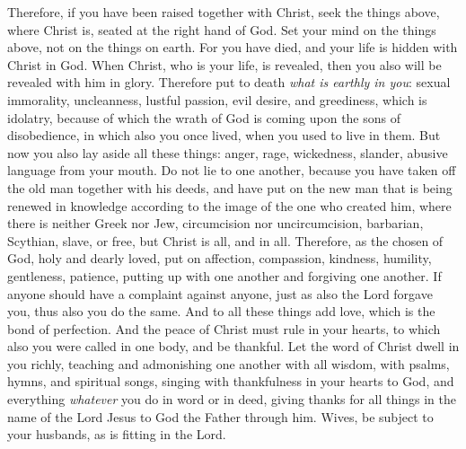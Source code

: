 \begin{biblechapter} %
 Therefore, if you have been raised together with Christ, seek the things above, where Christ is, seated at the right hand of God.
\verse Set your mind on the things above, not on the things on earth.
\verse For you have died, and your life is hidden with Christ in God.
\verse When Christ, who is your life, is revealed, then you also will be revealed with him in glory.
 Therefore put to death \textit{what is earthly in you}: sexual immorality, uncleanness, lustful passion, evil desire, and greediness, which is idolatry,
\verse because of which the wrath of God is coming upon the sons of disobedience,
\verse in which also you once lived, when you used to live in them.
\verse But now you also lay aside all these things: anger, rage, wickedness, slander, abusive language from your mouth.
\verse Do not lie to one another, because you have taken off the old man together with his deeds,
\verse and have put on the new man that is being renewed in knowledge according to the image of the one who created him,
\verse where there is neither Greek nor Jew, circumcision nor uncircumcision, barbarian, Scythian, slave, or free, but Christ is all, and in all.
 Therefore, as the chosen of God, holy and dearly loved, put on affection, compassion, kindness, humility, gentleness, patience,
\verse putting up with one another and forgiving one another. If anyone should have a complaint against anyone, just as also the Lord forgave you, thus also you do the same.
\verse And to all these things add love, which is the bond of perfection.
\verse And the peace of Christ must rule in your hearts, to which also you were called in one body, and be thankful.
\verse Let the word of Christ dwell in you richly, teaching and admonishing one another with all wisdom, with psalms, hymns, and spiritual songs, singing with thankfulness in your hearts to God,
\verse and everything \textit{whatever} you do in word or in deed, giving thanks for all things in the name of the Lord Jesus to God the Father through him.
 Wives, be subject to your husbands, as is fitting in the Lord.

\end{biblechapter}
